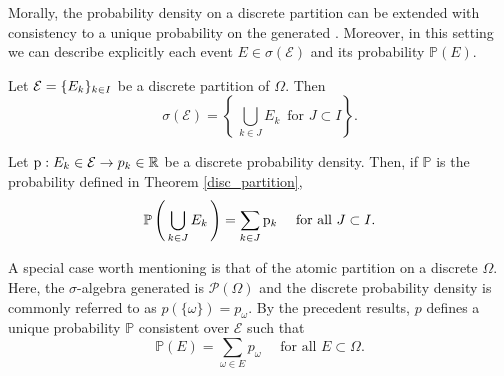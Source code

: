 Morally, the probability density on a discrete partition can be extended with consistency to a unique probability on the generated \sigmaalg. 
Moreover, in this setting we can describe explicitly each event $E\in\sigma(\mathcal{E})$ and its probability $\mathbb{P}(E)$.

\begin{my_lemma}
	\label{explicit_char}
	Let $\mathcal{E}=\{ E_k \}_{k\in I}$ be a discrete partition of $\Omega$. Then
	\[
		\sigma( \mathcal{E} ) = \left\{ \, \bigcup_{k \in J} E_k \, \text{ for }J \subset I \right\}.
	\]
\end{my_lemma}
\begin{my_lemma}
	Let $\mathrm{p} : E_k \in \mathcal{E} \to p_k \in \mathbb{R}$ be a discrete probability density. Then, if $\mathbb{P}$ is the probability defined in Theorem \ref{disc_partition},
	\[
		\mathbb{P} \left( \, \bigcup_{k \in J} E_k \,\right) = \sum_{k \in J} \mathrm{p}_k \quad \text{ for all }J \subset I.
	\]
\end{my_lemma}
 
\begin{my_remark}
	A special case worth mentioning is that of the atomic partition on a discrete $\Omega$. 
	Here, the $\sigma$-algebra generated is $\mathcal{P}(\Omega)$ and the discrete probability density is commonly referred to as $p(\{ \omega \})=p_\omega$. 
	By the precedent results, $p$ defines a unique probability $\mathbb{P}$ consistent over $\mathcal{E}$ such that
	\begin{equation}
		\mathbb{P} \left( E \right) = \sum_{\omega \in E} p_\omega \quad \text{ for all }E \subset \Omega.		
	\end{equation}
\end{my_remark}

